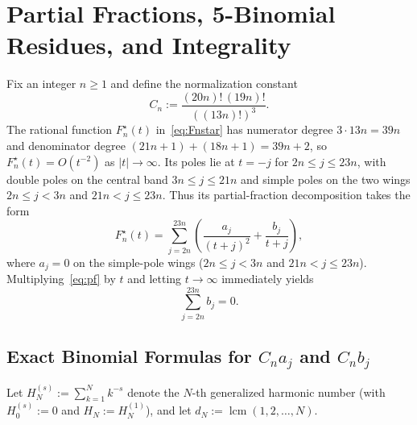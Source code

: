 \documentclass[11pt,reqno]{amsart}
\theoremstyle{definition}
\theoremstyle{remark}
\newcommand{\lcm}{\operatorname{lcm}}
\begin{document}
\section{Partial Fractions, 5-Binomial Residues, and Integrality}
\label{sec:pf}

Fix an integer $n \ge 1$ and define the normalization constant
\begin{equation}
\label{eq:Cn}
  C_n := \frac{(20n)!\,(19n)!}{((13n)!)^3}.
\end{equation}
The rational function $F_n^{\star}(t)$ in~\eqref{eq:Fnstar} has numerator degree $3 \cdot 13n = 39n$ and denominator degree $(21n + 1) + (18n + 1) = 39n + 2$, so $F_n^{\star}(t) = O(t^{-2})$ as $|t| \to \infty$. Its poles lie at $t = -j$ for $2n \le j \le 23n$, with double poles on the central band $3n \le j \le 21n$ and simple poles on the two wings $2n \le j < 3n$ and $21n < j \le 23n$. Thus its partial-fraction decomposition takes the form
\begin{equation}
\label{eq:pf}
  F_n^{\star}(t) = \sum_{j = 2n}^{23n} \left( \frac{a_j}{(t + j)^2} + \frac{b_j}{t + j} \right),
\end{equation}
where $a_j = 0$ on the simple-pole wings ($2n \le j < 3n$ and $21n < j \le 23n$). Multiplying~\eqref{eq:pf} by $t$ and letting $t \to \infty$ immediately yields
\begin{equation}
\label{eq:sum-b-zero}
  \sum_{j = 2n}^{23n} b_j = 0.
\end{equation}

\subsection{Exact Binomial Formulas for \texorpdfstring{$C_n a_j$ and $C_n b_j$}{C\_n a\_j and C\_n b\_j}}
Let $H_N^{(s)} := \sum_{k=1}^{N} k^{-s}$ denote the $N$-th generalized harmonic number (with $H_0^{(s)} := 0$ and $H_N := H_N^{(1)}$), and let $d_N := \lcm(1, 2, \ldots, N)$.
\end{document}
